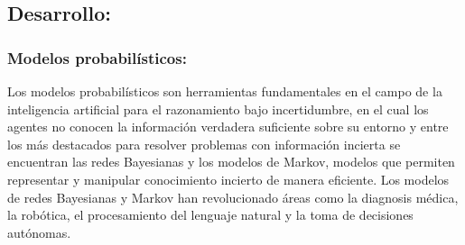 \documentclass[letterpaper,12pt]{article}
\begin{document}
\subsection{Desarrollo:}

\subsubsection{Modelos probabilísticos:}
Los modelos probabilísticos son herramientas fundamentales en el campo de la inteligencia artificial para el razonamiento bajo incertidumbre, en el cual los agentes no conocen la información verdadera suficiente sobre su entorno y entre los más destacados para resolver problemas con información incierta se encuentran las redes Bayesianas y los modelos de Markov, modelos que permiten representar y manipular conocimiento incierto de manera eficiente. 
Los modelos de redes Bayesianas y Markov han revolucionado áreas como la diagnosis médica, la robótica, el procesamiento del lenguaje natural y la toma de decisiones autónomas.
\end{document}
